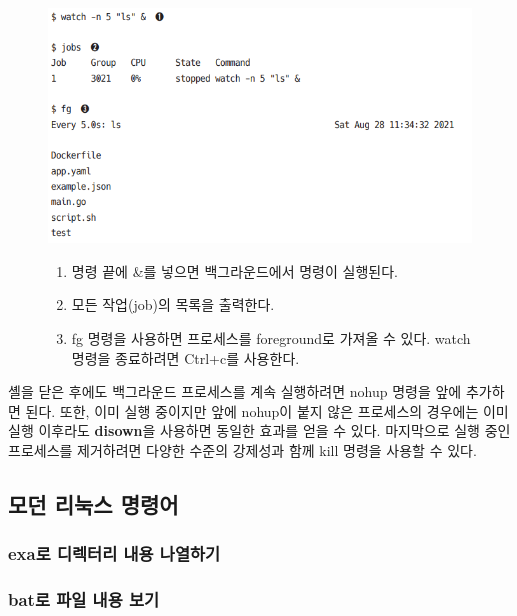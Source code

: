 \begin{figure}
    \includegraphics[width=15cm]{resource/3-job-control.png}
    \begin{enumerate}
        \item 명령 끝에 \&를 넣으면 백그라운드에서 명령이 실행된다.
        \item 모든 작업(job)의 목록을 출력한다.
        \item fg 명령을 사용하면 프로세스를 foreground로 가져올 수 있다.
            watch 명령을 종료하려면 Ctrl+c를 사용한다.
    \end{enumerate}
\end{figure}

\begin{flushleft}
    셸을 닫은 후에도 백그라운드 프로세스를 계속 실행하려면 nohup 명령을 앞에 추가하면 된다.
    또한, 이미 실행 중이지만 앞에 nohup이 붙지 않은 프로세스의 경우에는
    이미 실행 이후라도 \textbf{disown}을 사용하면 동일한 효과를 얻을 수 있다.
    마지막으로 실행 중인 프로세스를 제거하려면 다양한 수준의 강제성과 함께 kill 명령을 사용할 수 있다.
\end{flushleft}

\subsection*{모던 리눅스 명령어}

\subsubsection*{exa로 디렉터리 내용 나열하기}

\subsubsection*{bat로 파일 내용 보기}

